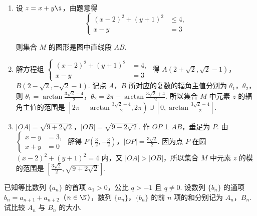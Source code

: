 \begin{solution}
\begin{enumerate}
\item 设 \(z=x+y\i\)，由题意得
\[
\left\{
\begin{aligned}
(x-2)^2+(y+1)^2&\leqslant 4,\\
x-y&=3
\end{aligned}
\right.%
\]


则集合 \(M\) 的图形是图中直线段 \(AB\).

\item 解方程组 \(\left\{\begin{aligned}(x-2)^2+(y+1)^2&=4,\\ x-y&=3\end{aligned}\right.\) 得 \(A(2+\sqrt{2},\sqrt{2}-1)\)，\(B(2-\sqrt{2},-\sqrt{2}-1)\). 记点 \(A\)，\(B\) 所对应的复数的辐角主值分别为 \(\theta_1\)，\(\theta_2\)，则 \(\theta_1=\arctan\frac{3\sqrt{2}-4}{2}\)，\(\theta_2=2\pi-\arctan\frac{3\sqrt{2}+4}{2}\). 所以集合 \(M\) 中元素 \(z\) 的辐角主值的范围是 \(\left[ 2\pi-\arctan\frac{3\sqrt{2}+4}{2},2\pi \right)\cup \left[ 0,\arctan\frac{3\sqrt{2}-4}{2} \right]\).

\item \(|OA|=\sqrt{9+2\sqrt{2}}\)，\(|OB|=\sqrt{9-2\sqrt{2}}\). 作 \(OP\perp AB\)，垂足为 \(P\). 由 \(\left\{\begin{aligned}x-y&=3,\\ x+y&=0\end{aligned}\right.\) 解得 \(P\left( \frac{3}{2},-\frac{3}{2} \right)\)，\(|OP|=\frac{3\sqrt{2}}{2}\). 因为点 \(P\) 在圆 \((x-2)^2+(y+1)^2=4\) 内，又 \(|OA|>|OB|\)，所以集合 \(M\) 中元素 \(z\) 的模的范围是 \(\left[ \frac{3\sqrt{2}}{2},\sqrt{9+2\sqrt{2}} \right]\).
\end{enumerate}
\end{solution}

\begin{problem}
已知等比数列 \(\{a_n\}\) 的首项 \(a_1>0\)，公比 \(q>-1\) 且 \(q\neq 0\). 设数列 \(\{b_n\}\) 的通项 \(b_n=a_{n+1}+a_{n+2}\)（\(n\in \N\)），数列 \(\{a_n\}\)，\(\{b_n\}\) 的前 \(n\) 项的和分别记为 \(A_n\)，\(B_n\). 试比较 \(A_n\) 与 \(B_n\) 的大小.
\end{problem}

